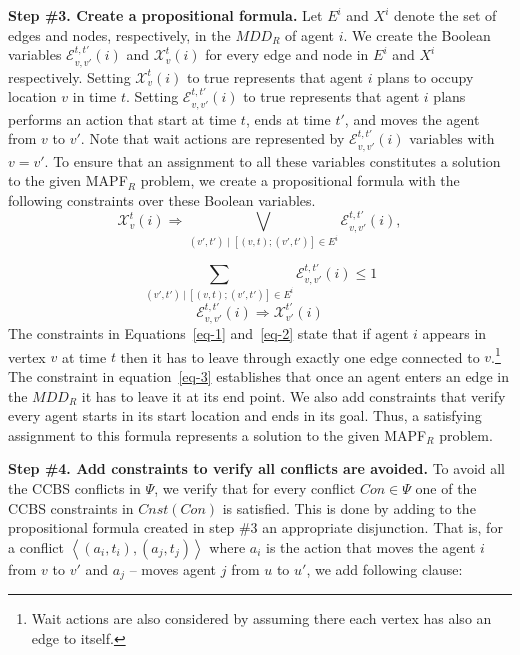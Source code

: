 \documentclass[review]{elsarticle}
\newcommand{\tuple}[1]{\ensuremath{\left \langle #1 \right \rangle }}
\newcommand{\mddr}{\ensuremath{MDD_R}\xspace}
\newcommand\konstantin[1]{\nb{\textbf{Konstantin:}}{red}{#1}}
\newcommand\roni[1]{\nb{\textbf{Roni:}}{green}{#1}}
\newcommand{\ccbs}{\ac{CCBS}\xspace}
\newcommand{\mapfr}{\ac{MAPF}$_R$\xspace}
\begin{document}
\noindent \textbf{Step \#3. Create a propositional formula.}
Let $E^i$ and $X^i$ denote the set of edges and nodes, respectively, in the \mddr of agent $i$.
We create the Boolean variables $\mathcal{E}_{v,v'}^{t,t'}(i)$ and $\mathcal{X}_{v}^{t}(i)$ 
for every edge and node in $E^i$ and $X^i$ respectively. 
Setting $\mathcal{X}_v^t(i)$ to true represents that agent $i$ plans to occupy location $v$ in time $t$. 
Setting $\mathcal{E}_{v,v'}^{t,t'}(i)$ to true represents that agent $i$ plans performs an action that start at time $t$, ends at time $t'$, and moves the agent from $v$ to $v'$. 
Note that wait actions are represented by $\mathcal{E}_{v,v'}^{t,t'}(i)$ variables with $v=v'$. 
To ensure that an assignment to all these variables constitutes a solution to the given \mapfr problem, 
we create a propositional formula with the following constraints over these Boolean variables. 
\begin{equation}
{  \mathcal{X}_v^t(i) \Rightarrow \bigvee_{(v',t')\;|\;[(v,t);(v',t')] \in E^i}{\mathcal{E}^{t,t'}_{v,v'}(i)},
}
\label{eq-1}
\end{equation}

\begin{equation}
{  \sum_{(v',t')\:|\:[(v,t);(v',t')] \in E^i }{\mathcal{E}_{v,v'}^{t,t'}{(i)} \leq 1}
}
\label{eq-2}
\end{equation}
\begin{equation}
{  \mathcal{E}_{v,v'}^{t,t'}(i) \Rightarrow \mathcal{X}_{v'}^{t'}(i)
}
\label{eq-3}
\end{equation}
The constraints in Equations~\ref{eq-1} and~\ref{eq-2} state that if agent $i$ appears in vertex $v$ at time $t$ then it has to leave through exactly one edge connected to $v$.\footnote{Wait actions are also considered by assuming there each vertex has also an edge to itself.} 
The constraint in equation~\ref{eq-3} establishes that once an agent enters an edge in the \mddr it has to leave it at its end point. 
We also add constraints that verify every agent starts in its start location and ends in its goal.
Thus, a satisfying assignment to this formula represents a solution to the given \mapfr problem. 


\noindent \textbf{Step \#4. Add constraints to verify all conflicts are avoided.}
To avoid all the \ccbs conflicts in $\Psi$, we verify that for every conflict $Con\in\Psi$ one of the \ccbs constraints in $Cnst(Con)$ is satisfied. 
This is done by adding to the propositional formula created in step \#3 
an appropriate disjunction. 
That is, for a conflict $\tuple{(a_i,t_i), (a_j, t_j)}$ 
where $a_i$ is the action that moves the agent $i$ from $v$ to $v'$ 
and $a_j$ -- moves agent $j$ from $u$ to $u'$, 
we add following clause:
\end{document}
